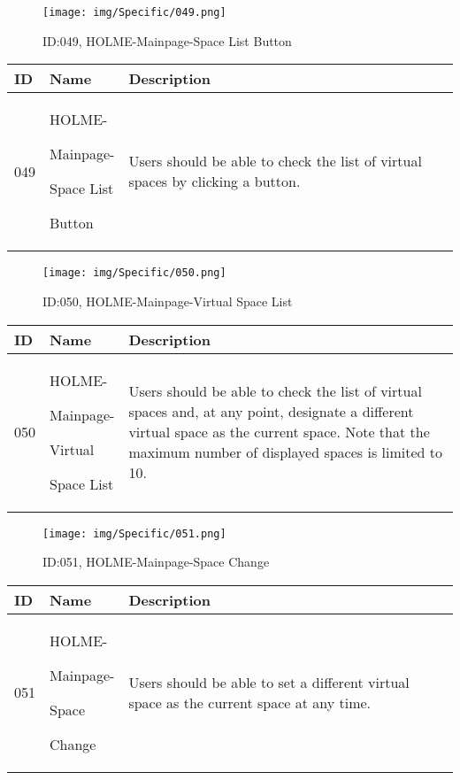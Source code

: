 \documentclass[conference]{IEEEtran}
\begin{document}
\begin{enumerate}
\begin{figure}[h]
\centering
\texttt{[image: img/Specific/049.png]}
\caption{ID:049, HOLME-Mainpage-Space List Button}
\end{figure}
\begin{table}[h]
\def\arraystretch{1.2} \small
    \begin{tabular}{|p{1cm}|p{1.8cm}|p{5.0cm}|}
        \hline
        ID & Name & Description\\ \hline
         049 \par  & HOLME-\par Mainpage-\par Space List \par Button &Users should be able to check the list of virtual spaces by clicking a button.\\ \hline
    \end{tabular}
\end{table}
\clearpage

\begin{figure}[h]
\centering
\texttt{[image: img/Specific/050.png]}
\caption{ID:050, HOLME-Mainpage-Virtual Space List}
\end{figure}
\begin{table}[h]
\def\arraystretch{1.2} \small
    \begin{tabular}{|p{1cm}|p{1.8cm}|p{5.0cm}|}
        \hline
        ID & Name & Description\\ \hline
         050 \par  & HOLME-\par Mainpage-\par Virtual \par Space List&Users should be able to check the list of virtual spaces and, at any point, designate a different virtual space as the current space. Note that the maximum number of displayed spaces is limited to 10.\\ \hline
    \end{tabular}
\end{table}

\begin{figure}[h]
\centering
\texttt{[image: img/Specific/051.png]}
\caption{ID:051, HOLME-Mainpage-Space Change}
\end{figure}
\begin{table}[h]
\def\arraystretch{1.2} \small
    \begin{tabular}{|p{1cm}|p{1.8cm}|p{5.0cm}|}
        \hline
        ID & Name & Description\\ \hline
         051 \par  & HOLME-\par Mainpage-\par Space \par Change&Users should be able to set a different virtual space as the current space at any time.\\ \hline
    \end{tabular}
\end{table}


\end{enumerate}
\end{document}
